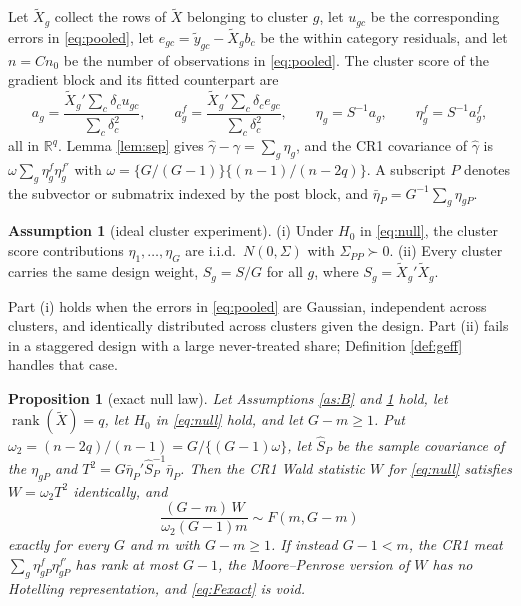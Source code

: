 \documentclass[12pt]{article}
\newtheorem{proposition}{Proposition}
\theoremstyle{definition}
\newtheorem{assumption}{Assumption}
\numberwithin{equation}{section}
\begin{document}
Let $\tilde{X}_g$ collect the rows of $\tilde{X}$ belonging to cluster $g$, let
$u_{gc}$ be the corresponding errors in \eqref{eq:pooled}, let $e_{gc} =
\tilde{y}_{gc} - \tilde{X}_g b_c$ be the within category residuals, and let
$n = C n_0$ be the number of observations in \eqref{eq:pooled}. The cluster
score of the gradient block and its fitted counterpart are
\begin{equation}
a_g = \frac{\tilde{X}_g'\sum_c \delta_c u_{gc}}{\sum_c \delta_c^2},
\qquad
a^f_g = \frac{\tilde{X}_g'\sum_c \delta_c e_{gc}}{\sum_c \delta_c^2},
\qquad
\eta_g = S^{-1}a_g, \qquad \eta^f_g = S^{-1}a^f_g ,
\label{eq:eta}
\end{equation}
all in $\mathbb{R}^q$. Lemma \ref{lem:sep} gives $\hat{\gamma} - \gamma =
\sum_g \eta_g$, and the CR1 covariance of $\hat{\gamma}$ is $\omega \sum_g
\eta^f_g \eta^{f\prime}_g$ with $\omega = \{G/(G-1)\}\{(n-1)/(n-2q)\}$. A
subscript $P$ denotes the subvector or submatrix indexed by the post block, and
$\bar{\eta}_P = G^{-1}\sum_g \eta_{gP}$.

\begin{assumption}[ideal cluster experiment]
\label{as:I}
(i) Under $H_0$ in \eqref{eq:null}, the cluster score contributions
$\eta_1,\dots,\eta_G$ are i.i.d.\ $N(0,\Sigma)$ with $\Sigma_{PP} \succ 0$.
(ii) Every cluster carries the same design weight, $S_g = S/G$ for all $g$,
where $S_g = \tilde{X}_g'\tilde{X}_g$.
\end{assumption}

Part (i) holds when the errors in \eqref{eq:pooled} are Gaussian, independent
across clusters, and identically distributed across clusters given the design.
Part (ii) fails in a staggered design with a large never-treated share;
Definition \ref{def:geff} handles that case.

\begin{proposition}[exact null law]
\label{prop:anatomy}
Let Assumptions \ref{as:B} and \ref{as:I} hold, let
$\operatorname{rank}(\tilde{X}) = q$, let $H_0$ in \eqref{eq:null} hold, and let
$G - m \ge 1$. Put $\omega_2 = (n-2q)/(n-1) = G/\{(G-1)\omega\}$, let $\hat{S}_P$
be the sample covariance of the $\eta_{gP}$ and $T^2 = G \bar{\eta}_P'
\hat{S}_P^{-1} \bar{\eta}_P$. Then the CR1 Wald statistic $W$ for
\eqref{eq:null} satisfies $W = \omega_2 T^2$ identically, and
\begin{equation}
\frac{(G-m)\,W}{\omega_2 (G-1) m} \sim F(m, G-m)
\label{eq:Fexact}
\end{equation}
exactly for every $G$ and $m$ with $G - m \ge 1$. If instead $G - 1 < m$, the
CR1 meat $\sum_g \eta^f_{gP}\eta^{f\prime}_{gP}$ has rank at most $G-1$, the
Moore--Penrose version of $W$ has no Hotelling representation, and
\eqref{eq:Fexact} is void.
\end{proposition}
\end{document}
